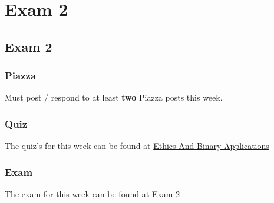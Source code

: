 \clearpage

\renewcommand{\ChapTitle}{Exam 2}
\renewcommand{\SectionTitle}{Exam 2}

\chapter{\ChapTitle}
\section{\SectionTitle}

\subsection{Piazza}

Must post / respond to at least \textbf{two} Piazza posts this week.  

\subsection{Quiz}

The quiz's for this week can be found at \href{https://applied.cs.colorado.edu/mod/quiz/view.php?id=51821}{Ethics And Binary Applications} \textbullet {}  

\subsection{Exam}

The exam for this week can be found at \href{https://applied.cs.colorado.edu/mod/quiz/view.php?id=51823}{Exam 2}  